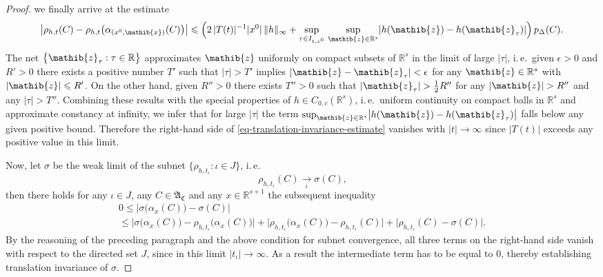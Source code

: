 \documentclass[11pt,twoside,openright]{report}
\theoremstyle{definition}
\theoremstyle{plain}
\theoremstyle{remark}
\theoremstyle{assumption}
\newcommand{\bset}[1]{\bigl\{ #1 \bigr\}}
\newcommand{\abs}[1]{\lvert #1 \rvert}
\newcommand{\babs}[1]{\bigl\lvert #1 \bigr\rvert}
\newcommand{\norm}[1]{\lVert #1 \rVert}
\newcommand{\pDx}[1]{p_\Delta ( #1 )}
\newcommand{\Rbb}{\mathbb{R}}
\newcommand{\xib}{\mathib{x}}
\newcommand{\zib}{\mathib{z}}
\newcommand{\Rs}{\mathbb{R}^s}
\newcommand{\Rsone}{\mathbb{R}^{s + 1}}
\newcommand{\AC}{\mathfrak{A}_\mathfrak{C}}
\newcommand{\ax}{\alpha_x}
\begin{document}
\begin{proof}
  we finally arrive at the estimate
  \begin{equation}
    \label{eq-translation-invariance-estimate}
    \babs{\rho_{h , t} ( C ) - \rho_{h , t} \bigl( \alpha_{( x^0 ,\xib
    )} ( C ) \bigr)} 
    \leqslant \Bigl( 2 \, \abs{T ( t )}^{-1} \abs{x^0} \,
    \norm{h}_\infty + \sup_{\tau \in I_{t , x^0}} \, \sup_{\zib \in
    \Rs} \abs{h ( \zib ) - h ( \zib_\tau )} \Bigr) \, \pDx{C} \text{.}
  \end{equation}
  The net $\bset{\zib_\tau : \tau \in \Rbb}$ approximates $\zib$
  uniformly on compact subsets of $\Rs$ in the limit of large
  $\abs{\tau}$, i.\,e.~given $\epsilon > 0$ and $R' > 0$ there exists
  a positive number $T'$ such that $\abs{\tau} > T'$ implies
  $\abs{\zib - \zib_\tau} < \epsilon$ for any $\zib \in \Rs$ with
  $\abs{\zib} \leqslant R'$. On the other hand, given $R'' > 0$ there
  exists $T'' > 0$ such that $\abs{\zib_\tau} > \frac{1}{2} R''$ for
  any $\abs{\zib} > R'' $ and any $\abs{\tau} > T''$. Combining these
  results with the special properties of $h \in C_{0 , c} ( \Rs )$,
  i.\,e.~uniform continuity on compact balls in $\Rs$ and approximate
  constancy at infinity, we infer that for large $\abs{\tau}$ the term
  $\sup_{\zib \in \Rs} \babs{h ( \zib ) - h ( \zib_\tau )}$ falls
  below any given positive bound. Therefore the right-hand side of
  \eqref{eq-translation-invariance-estimate} vanishes with $\abs{t}
  \rightarrow \infty$ since $\abs{T ( t )}$ exceeds any positive value
  in this limit.

  Now, let $\sigma$ be the weak limit of the subnet $\bset{\rho_{h ,
  t_\iota} : \iota \in J}$, i.\,e. 
  \begin{equation*}
    \rho_{h , t_\iota} ( C ) \underset{\iota}{\longrightarrow} \sigma
    ( C ) \text{,}
  \end{equation*}
  then there holds for any $\iota \in J$, any $C \in \AC$ and any $x
  \in \Rsone$ the subsequent inequality
  \begin{multline*}
    0 \leqslant \babs{\sigma \bigl( \ax ( C ) \bigr) - \sigma ( C )}
    \\
    \leqslant \babs{\sigma \bigl( \ax ( C ) \bigr) - \rho_{h ,
    t_\iota} \bigl( \ax ( C ) \bigr)} + \babs{\rho_{h , t_\iota}
    \bigl( \ax ( C ) \bigr) - \rho_{h , t_\iota} ( C )} +
    \babs{\rho_{h , t_\iota} ( C ) - \sigma ( C )} \text{.}
  \end{multline*}
  By the reasoning of the preceding paragraph and the above condition
  for subnet convergence, all three terms on the right-hand side
  vanish with respect to the directed set $J$, since in this limit
  $\abs{t_\iota} \rightarrow \infty$. As a result the intermediate
  term has to be equal to $0$, thereby establishing translation
  invariance of $\sigma$.
\end{proof}
\end{document}
